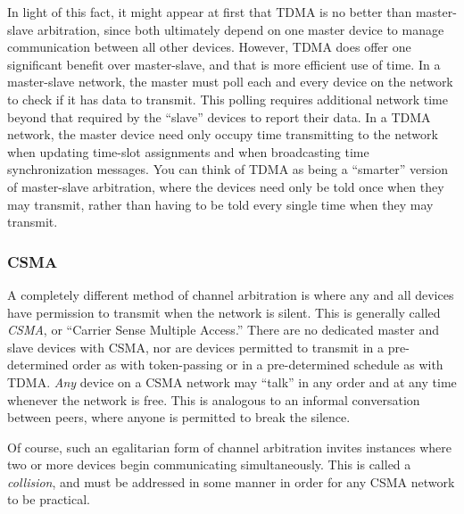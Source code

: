 In light of this fact, it might appear at first that TDMA is no better than master-slave arbitration, since both ultimately depend on one master device to manage communication between all other devices.  However, TDMA does offer one significant benefit over master-slave, and that is more efficient use of time.  In a master-slave network, the master must poll each and every device on the network to check if it has data to transmit.  This polling requires additional network time beyond that required by the ``slave'' devices to report their data.  In a TDMA network, the master device need only occupy time transmitting to the network when updating time-slot assignments and when broadcasting time synchronization messages.  You can think of TDMA as being a ``smarter'' version of master-slave arbitration, where the devices need only be told once when they may transmit, rather than having to be told every single time when they may transmit.








\filbreak
\subsubsection{CSMA}

A completely different method of channel arbitration is where any and all devices have permission to transmit when the network is silent.  This is generally called \textit{CSMA}, or ``Carrier Sense Multiple Access.''  There are no dedicated master and slave devices with CSMA, nor are devices permitted to transmit in a pre-determined order as with token-passing or in a pre-determined schedule as with TDMA.  \textit{Any} device on a CSMA network may ``talk'' in any order and at any time whenever the network is free.  This is analogous to an informal conversation between peers, where anyone is permitted to break the silence.    

Of course, such an egalitarian form of channel arbitration invites instances where two or more devices begin communicating simultaneously.  This is called a \textit{collision}, and must be addressed in some manner in order for any CSMA network to be practical.  

\vskip 10pt


